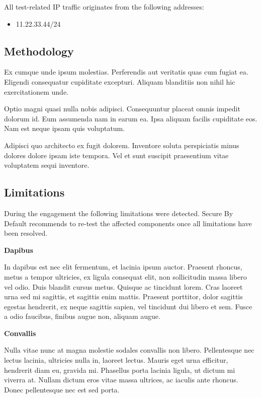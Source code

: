 \documentclass[a4paper]{article}
\begin{document}
All test-related IP traffic originates from the following addresses:

\begin{itemize}
  \item 11.22.33.44/24
\end{itemize}

\subsection{Methodology}

Ex cumque unde ipsum molestias.
Perferendis aut veritatis quas cum fugiat ea.
Eligendi consequatur cupiditate excepturi.
Aliquam blanditiis non nihil hic exercitationem unde.

Optio magni quasi nulla nobis adipisci.
Consequuntur placeat omnis impedit dolorum id.
Eum assumenda nam in earum ea.
Ipsa aliquam facilis cupiditate eos.
Nam est neque ipsam quis voluptatum.

Adipisci quo architecto ex fugit dolorem.
Inventore soluta perspiciatis minus dolores dolore ipsam iste tempora.
Vel et sunt suscipit praesentium vitae voluptatem sequi inventore.



  \subsection{Limitations}

  During the engagement the following limitations were detected.
  Secure By Default recommends to re-test the affected components once all limitations have been resolved.

  \textbf{Dapibus}

In dapibus est nec elit fermentum, et lacinia ipsum auctor.
Praesent rhoncus, metus a tempor ultricies, ex ligula consequat elit, non sollicitudin massa libero vel odio.
Duis blandit cursus metus.
Quisque ac tincidunt lorem.
Cras laoreet urna sed mi sagittis, et sagittis enim mattis.
Praesent porttitor, dolor sagittis egestas hendrerit, ex neque sagittis sapien, vel tincidunt dui libero et sem.
Fusce a odio faucibus, finibus augue non, aliquam augue.

\textbf{Convallis}

Nulla vitae nunc at magna molestie sodales convallis non libero.
Pellentesque nec lectus lacinia, ultricies nulla in, laoreet lectus.
Mauris eget urna efficitur, hendrerit diam eu, gravida mi.
Phasellus porta lacinia ligula, ut dictum mi viverra at.
Nullam dictum eros vitae massa ultrices, ac iaculis ante rhoncus.
Donec pellentesque nec est sed porta.
\end{document}
